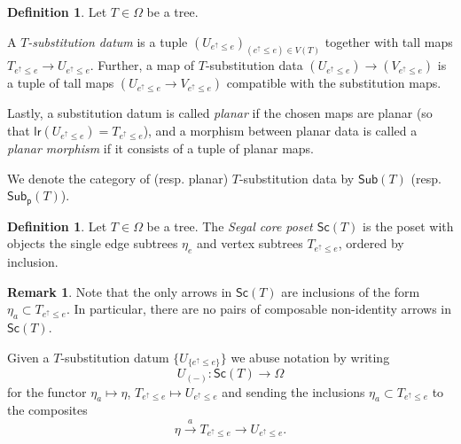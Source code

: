 \documentclass[a4paper,10pt
,draft
]{article}%
\numberwithin{equation}{section}
\numberwithin{figure}{section}
\theoremstyle{definition} %
\newtheorem{definition}[equation]{Definition}%
\newtheorem{remark}[equation]{Remark}%
\newcommand{\1}{\ensuremath{\mathbbm 1}}%
\begin{document}
\begin{definition}\label{SUBSTITUTIONDATUM}
	Let $T \in \Omega$ be a tree.
	
	A \textit{$T$-substitution datum} is a tuple 
	$\left(U_{e^{\uparrow} \leq e}\right)_{(e^{\uparrow} \leq e)\in V(T)}$ together with tall maps
	$T_{e^{\uparrow}\leq e} \to U_{e^{\uparrow}\leq e}$.
	Further, a map of $T$-substitution data 
	$\left(U_{e^{\uparrow} \leq e}\right) \to \left(V_{e^{\uparrow} \leq e}\right)$ is a tuple of tall maps $\left(U_{e^{\uparrow} \leq e}\to V_{e^{\uparrow} \leq e}\right)$ compatible with the substitution maps.
	
	Lastly, a substitution datum is called \textit{planar}
        if the chosen maps are planar (so that 
	$\mathsf{lr}(U_{e^{\uparrow} \leq e}) = T_{e^{\uparrow} \leq e}$),
        and a morphism between planar data is called a \textit{planar morphism} if it consists of a tuple of planar maps.
	
	We denote the category of (resp. planar) $T$-substitution data 
	by $\mathsf{Sub}(T)$ (resp. $\mathsf{Sub}_{\mathsf{p}}(T)$).
\end{definition}

\begin{definition}
	Let $T \in \Omega$ be a tree. 
	The \textit{Segal core poset $\mathsf{Sc}(T)$} is the poset with objects the single edge subtrees $\eta_e$ and vertex subtrees $T_{e^{\uparrow} \leq e}$, ordered by inclusion.
\end{definition}


\begin{remark}\label{SCTARR REM}
Note that the only arrows in $\mathsf{Sc}(T)$ are inclusions of the form $\eta_a \subset T_{e^{\uparrow}\leq e}$.
In particular, there are no pairs of composable non-identity arrows in $\mathsf{Sc}(T)$. 
\end{remark}

Given a $T$-substitution datum $\{U_{\{e^{\uparrow}\leq e\}}\}$ we abuse notation by writing
\[U_{(\minus)} \colon \mathsf{Sc}(T) \to \Omega\]
for the functor $\eta_a \mapsto \eta$, $T_{e^{\uparrow} \leq e} \mapsto U_{e^{\uparrow} \leq e}$  
and sending the inclusions $\eta_a \subset T_{e^{\uparrow} \leq e}$
to the composites
\[
\eta \xrightarrow{a} T_{e^{\uparrow} \leq e}  \to 
U_{e^{\uparrow} \leq e}.\]
\end{document}
